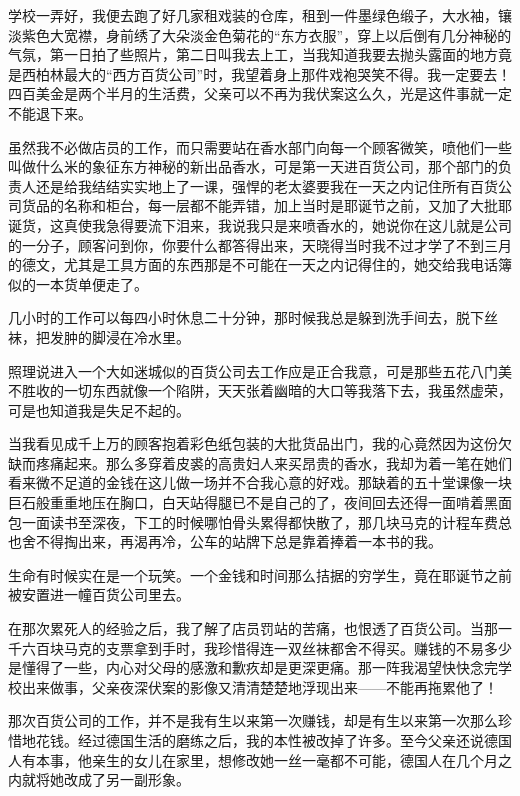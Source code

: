 \par 学校一弄好，我便去跑了好几家租戏装的仓库，租到一件墨绿色缎子，大水袖，镶淡紫色大宽襟，身前绣了大朵淡金色菊花的“东方衣服”，穿上以后倒有几分神秘的气氛，第一日拍了些照片，第二日叫我去上工，当我知道我要去抛头露面的地方竟是西柏林最大的“西方百货公司”时，我望着身上那件戏袍哭笑不得。我一定要去！四百美金是两个半月的生活费，父亲可以不再为我伏案这么久，光是这件事就一定不能退下来。
\par 虽然我不必做店员的工作，而只需要站在香水部门向每一个顾客微笑，喷他们一些叫做什么米的象征东方神秘的新出品香水，可是第一天进百货公司，那个部门的负责人还是给我结结实实地上了一课，强悍的老太婆要我在一天之内记住所有百货公司货品的名称和柜台，每一层都不能弄错，加上当时是耶诞节之前，又加了大批耶诞货，这真使我急得要流下泪来，我说我只是来喷香水的，她说你在这儿就是公司的一分子，顾客问到你，你要什么都答得出来，天晓得当时我不过才学了不到三月的德文，尤其是工具方面的东西那是不可能在一天之内记得住的，她交给我电话簿似的一本货单便走了。
\par 几小时的工作可以每四小时休息二十分钟，那时候我总是躲到洗手间去，脱下丝袜，把发肿的脚浸在冷水里。
\par 照理说进入一个大如迷城似的百货公司去工作应是正合我意，可是那些五花八门美不胜收的一切东西就像一个陷阱，天天张着幽暗的大口等我落下去，我虽然虚荣，可是也知道我是失足不起的。
\par 当我看见成千上万的顾客抱着彩色纸包装的大批货品出门，我的心竟然因为这份欠缺而疼痛起来。那么多穿着皮裘的高贵妇人来买昂贵的香水，我却为着一笔在她们看来微不足道的金钱在这儿做一场并不合我心意的好戏。那缺着的五十堂课像一块巨石般重重地压在胸口，白天站得腿已不是自己的了，夜间回去还得一面啃着黑面包一面读书至深夜，下工的时候哪怕骨头累得都快散了，那几块马克的计程车费总也舍不得掏出来，再渴再冷，公车的站牌下总是靠着捧着一本书的我。
\par 生命有时候实在是一个玩笑。一个金钱和时间那么拮据的穷学生，竟在耶诞节之前被安置进一幢百货公司里去。
\par 在那次累死人的经验之后，我了解了店员罚站的苦痛，也恨透了百货公司。当那一千六百块马克的支票拿到手时，我珍惜得连一双丝袜都舍不得买。赚钱的不易多少是懂得了一些，内心对父母的感激和歉疚却是更深更痛。那一阵我渴望快快念完学校出来做事，父亲夜深伏案的影像又清清楚楚地浮现出来——不能再拖累他了！
\par 那次百货公司的工作，并不是我有生以来第一次赚钱，却是有生以来第一次那么珍惜地花钱。经过德国生活的磨练之后，我的本性被改掉了许多。至今父亲还说德国人有本事，他亲生的女儿在家里，想修改她一丝一毫都不可能，德国人在几个月之内就将她改成了另一副形象。
\par  
